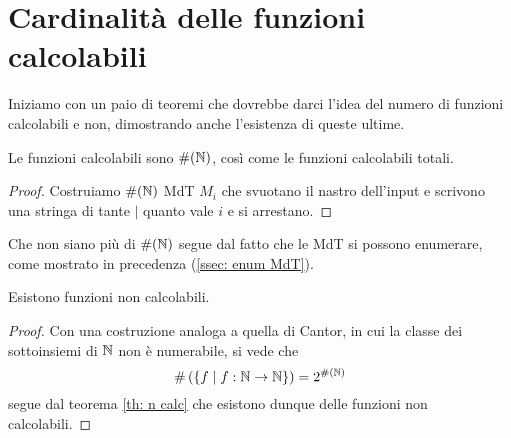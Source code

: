 \section{Cardinalità delle funzioni calcolabili}
Iniziamo con un paio di teoremi che dovrebbe darci l'idea del
numero di funzioni calcolabili e non, dimostrando anche
l'esistenza di queste ultime.

\begin{theorem} \label{th: n calc}
	Le funzioni calcolabili sono $\#(\mathbb{N})$, così come le funzioni
	calcolabili totali.
	\begin{proof}
		Costruiamo $\#(\mathbb{N})$ MdT $M_i$ che svuotano il nastro
		dell'input e scrivono una stringa di tante $|$ quanto
		vale $i$ e si arrestano.
	\end{proof}
\end{theorem}

Che non siano più di $\#(\mathbb{N})$ segue dal fatto che le MdT si
possono enumerare, come mostrato in precedenza
(\ref{ssec: enum MdT}).

\begin{theorem} \label{th: exists non calc}
	Esistono funzioni non calcolabili.
	\begin{proof}
		Con una costruzione analoga a quella di Cantor, in cui
		la classe dei sottoinsiemi di $\mathbb{N}$ non è numerabile,
		si vede che
		\[
			\# \left( \{ f \mid f : \mathbb{N} \to \mathbb{N} \} \right) =
			2^{\#(\mathbb{N})}
		\]
		segue dal teorema \ref{th: n calc} che esistono dunque
		delle funzioni non calcolabili.
	\end{proof}
\end{theorem}
